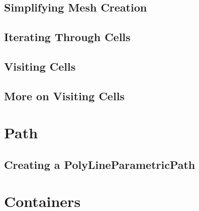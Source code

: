 


\subsection{Simplifying Mesh Creation}
\label{sec:AutomaticMesh}




\subsection{Iterating Through Cells}
\label{sec:MeshCellsIteration}




\subsection{Visiting Cells}
\label{sec:MeshCellVisitor}




\subsection{More on Visiting Cells}
\label{sec:MeshCellVisitorMultipleType}






\section{Path}\label{PathSection}

\subsection{Creating a PolyLineParametricPath}
\label{sec:CreatingAPolyLineParametricPath}



\section{Containers}\label{ContainersSection}
\label{sec:TreeContainer}

